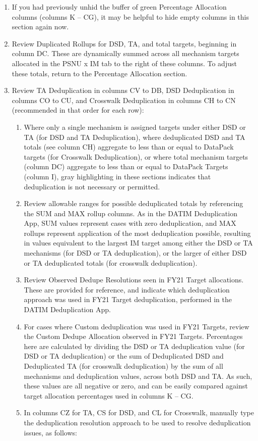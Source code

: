 \documentclass[
  openany]{book}
\begin{document}
\begin{enumerate}
\def\labelenumi{\arabic{enumi}.}
\item
  If you had previously unhid the buffer of green Percentage
  Allocation columns (columns K -- CG), it may be helpful to hide
  empty columns in this section again now.
\item
  Review Duplicated Rollups for DSD, TA, and total targets, beginning
  in column DC. These are dynamically summed across all mechanism
  targets allocated in the PSNU x IM tab to the right of these
  columns. To adjust these totals, return to the Percentage Allocation
  section.
\item
  Review TA Deduplication in columns CV to DB, DSD Deduplication in
  columns CO to CU, and Crosswalk Deduplication in columns CH to CN
  (recommended in that order for each row):

  \begin{enumerate}
  \def\labelenumii{\alph{enumii}.}
  \item
    Where only a single mechanism is assigned targets under either
    DSD or TA (for DSD and TA Deduplication), where deduplicated DSD
    and TA totals (see column CH) aggregate to less than or equal to
    DataPack targets (for Crosswalk Deduplication), or where total
    mechanism targets (column DC) aggregate to less than or equal to
    DataPack Targets (column I), gray highlighting in these sections
    indicates that deduplication is not necessary or permitted.
  \item
    Review allowable ranges for possible deduplicated totals by
    referencing the SUM and MAX rollup columns. As in the DATIM
    Deduplication App, SUM values represent cases with zero
    deduplication, and MAX rollups represent application of the most
    deduplication possible, resulting in values equivalent to the
    largest IM target among either the DSD or TA mechanisms (for DSD
    or TA deduplication), or the larger of either DSD or TA
    deduplicated totals (for crosswalk deduplication).
  \item
    Review Observed Dedupe Resolutions seen in FY21 Target
    allocations. These are provided for reference, and indicate
    which deduplication approach was used in FY21 Target
    deduplication, performed in the DATIM Deduplication App.
  \item
    For cases where Custom deduplication was used in FY21 Targets,
    review the Custom Dedupe Allocation observed in FY21 Targets.
    Percentages here are calculated by dividing the DSD or TA
    deduplication value (for DSD or TA deduplication) or the sum of
    Deduplicated DSD and Deduplicated TA (for crosswalk
    deduplication) by the sum of all mechanisms and deduplication
    values, across both DSD and TA. As such, these values are all
    negative or zero, and can be easily compared against target
    allocation percentages used in columns K -- CG.
  \item
    In columns CZ for TA, CS for DSD, and CL for Crosswalk, manually
    type the deduplication resolution approach to be used to resolve
    deduplication issues, as follows:


\end{enumerate}
\end{enumerate}
\end{document}
